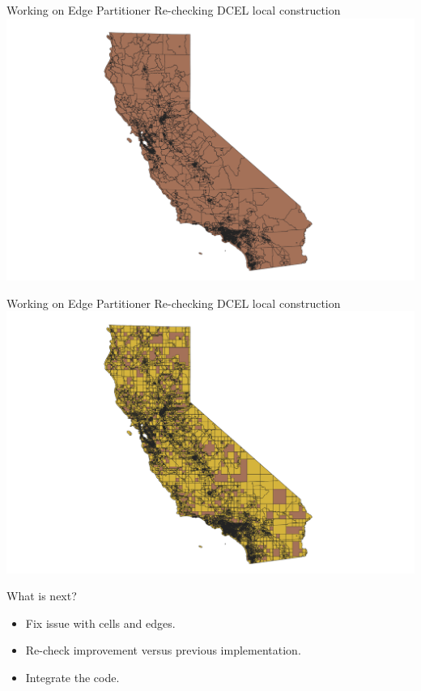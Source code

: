 \documentclass{beamer}
\begin{document}
\begin{frame}{Working on Edge Partitioner}
{Re-checking DCEL local construction}
    \centering 
    \includegraphics[width=\linewidth]{figures/CA_Cells01}     
\end{frame}

\begin{frame}{Working on Edge Partitioner}
{Re-checking DCEL local construction}
    \centering 
    \includegraphics[width=\linewidth]{figures/CA_Cells02}     
\end{frame}

\begin{frame}{What is next?}
    \begin{itemize}
        \item Fix issue with cells and edges.
        \item Re-check improvement versus previous implementation.
        \item Integrate the code.
    \end{itemize}
\end{frame}
\end{document}
